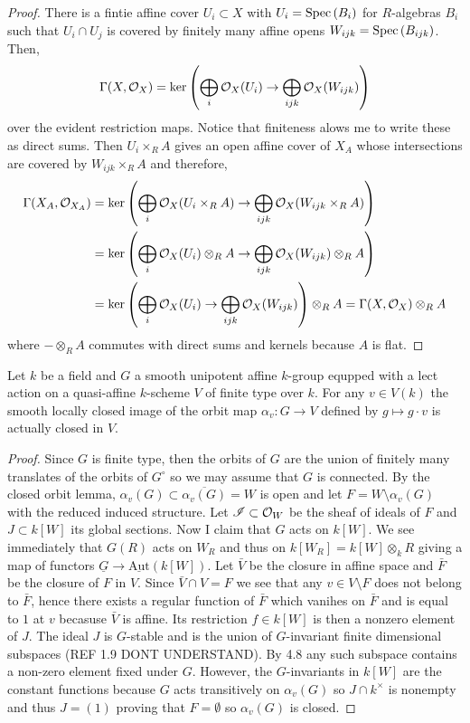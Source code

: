 \documentclass[12pt]{article}
\begin{document}
\begin{proof}
There is a fintie affine cover $U_i \subset X$ with $U_i = \mathrm{Spec}\left( B_i \right)$  for $R$-algebras $B_i$ such that $U_i \cap U_j$ is covered by finitely many affine opens $W_{ijk} = \mathrm{Spec}\left( B_{ijk} \right)$. Then,
\[ \Gamma(X, \mathcal{O}_{X}) = \ker{\left( \bigoplus_{i} \mathcal{O}_{X}(U_i) \to \bigoplus_{ijk} \mathcal{O}_{X}(W_{ijk}) \right)} \]
over the evident restriction maps. Notice that finiteness alows me to write these as direct sums. Then $U_i \times_R A$ gives an open affine cover of $X_A$ whose intersections are covered by $W_{ijk} \times_R A$ and therefore,
\begin{align*}
\Gamma(X_A, \mathcal{O}_{X_A}) & = \ker{\left( \bigoplus_i \mathcal{O}_{X}(U_i \times_R A) \to \bigoplus_{ijk} \mathcal{O}_{X}(W_{ijk} \times_R A) \right)}
\\
& = \ker{\left( \bigoplus_i \mathcal{O}_{X}(U_i) \otimes_R A \to \bigoplus_{ijk} \mathcal{O}_{X}(W_{ijk}) \otimes_R A\right)}
\\
& = \ker{\left( \bigoplus_i \mathcal{O}_{X}(U_i) \to \bigoplus_{ijk} \mathcal{O}_{X}(W_{ijk}) \right)} \otimes_R A = \Gamma(X, \mathcal{O}_{X}) \otimes_R A
\end{align*}
where $- \otimes_R A$ commutes with direct sums and kernels because $A$ is flat.
\end{proof}

\begin{prop}
Let $k$ be a field and $G$ a smooth unipotent affine $k$-group equpped with a lect action on a quasi-affine $k$-scheme $V$ of finite type over $k$. For any $v \in V(k)$ the smooth locally closed image of the orbit map $\alpha_v : G \to V$ defined by $g \mapsto g \cdot v$ is actually closed in $V$.
\end{prop}

\begin{proof}
Since $G$ is finite type, then the orbits of $G$ are the union of finitely many translates of the orbits of $G^\circ$ so we may assume that $G$ is connected. By the closed orbit lemma, $\alpha_v(G) \subset \overline{\alpha_v(G)} = W$ is open and let $F = W \setminus \alpha_v(G)$ with the reduced induced structure. Let $\mathscr{I} \subset \mathcal{O}_{W}$ be the sheaf of ideals of $F$ and $J \subset k[W]$ its global sections. Now I claim that $G$ acts on $k[W]$. We see immediately that $G(R)$ acts on $W_R$ and thus on $k[W_R] = k[W] \otimes_k R$ giving a map of functors $\underline{G} \to \underline{\mathrm{Aut}}(k[W])$. Let $\bar{V}$ be the closure in affine space and $\bar{F}$ be the closure of $F$ in $V$. Since $\bar{V} \cap V = F$ we see that any $v \in V \setminus F$ does not belong to $\bar{F}$, hence there exists a regular function of $\bar{F}$ which vanihes on $\bar{F}$ and is equal to $1$ at $v$ becasuse $\bar{V}$ is affine. Its restriction $f \in k[W]$ is then a nonzero element of $J$. The ideal $J$ is $G$-stable and is the union of $G$-invariant finite dimensional subspaces (REF 1.9 DONT UNDERSTAND). By 4.8 any such subspace contains a non-zero element fixed under $G$. However, the $G$-invariants in $k[W]$ are the constant functions because $G$ acts transitively on $\alpha_v(G)$ so $J \cap k^\times$ is nonempty and thus $J = (1)$ proving that $F = \emptyset$ so $\alpha_v(G)$ is closed.
\end{proof}
\end{document}
